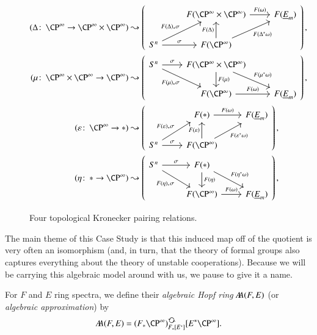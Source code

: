 \begin{figure}
\begin{align*}
(\Delta\co \CP^\infty \to \CP^\infty \times \CP^\infty) & \leadsto
\left(
\begin{tikzcd}[ampersand replacement=\&]
\& F(\CP^\infty \times \CP^\infty) \arrow["F(\omega)"]{r} \& F(\OS{E}{m}) \\
S^n \arrow["\sigma"]{r} \arrow["F(\Delta)_* \sigma"]{ru} \& F(\CP^\infty) \arrow["F(\Delta)"]{u} \arrow["F(\Delta^* \omega)"']{ru}
\end{tikzcd}
\right), \\
(\mu\co \CP^\infty \times \CP^\infty \to \CP^\infty) & \leadsto
\left(
\begin{tikzcd}[ampersand replacement=\&]
S^n \arrow["\sigma"]{r} \arrow["F(\mu)_* \sigma"']{rd} \& F(\CP^\infty \times \CP^\infty) \arrow["F(\mu)"]{d} \arrow["F(\mu^* \omega)"]{rd} \\
\& F(\CP^\infty) \arrow["F(\omega)"]{r} \& F(\OS{E}{m})
\end{tikzcd}
\right), \\
(\eps\co \CP^\infty \to *) & \leadsto
\left(
\begin{tikzcd}[ampersand replacement=\&]
\& F(*) \arrow["F(\omega)"]{r} \& F(\OS{E}{m}) \\
S^n \arrow["\sigma"]{r} \arrow["F(\eps)_* \sigma"]{ru} \& F(\CP^\infty) \arrow["F(\eps)"]{u} \arrow["F(\eps^* \omega)"']{ru}
\end{tikzcd}
\right), \\
(\eta\co * \to \CP^\infty) & \leadsto
\left(
\begin{tikzcd}[ampersand replacement=\&]
S^n \arrow["\sigma"]{r} \arrow["F(\eta)_* \sigma"']{rd} \& F(*) \arrow["F(\eta)"]{d} \arrow["F(\eta^* \omega)"]{rd} \\
\& F(\CP^\infty) \arrow["F(\omega)"]{r} \& F(\OS{E}{m})
\end{tikzcd}
\right),
\end{align*}
\caption{Four topological Kronecker pairing relations.}\label{KroneckerPairingFigure}
\end{figure}

The main theme of this Case Study is that this induced map off of the quotient is very often an isomorphism (and, in turn, that the theory of formal groups also captures everything about the theory of unstable cooperations).  Because we will be carrying this algebraic model around with us, we pause to give it a name.

\begin{definition}
For $F$ and $E$ ring spectra, we define their \textit{algebraic Hopf ring} $\AA(F, E)$ (or \textit{algebraic approximation}) by \[\AA(F, E) = (F_* \CP^\infty)_{F_*[E^*]}^{\circulatearrows}[E^* \CP^\infty].\]
\end{definition}

